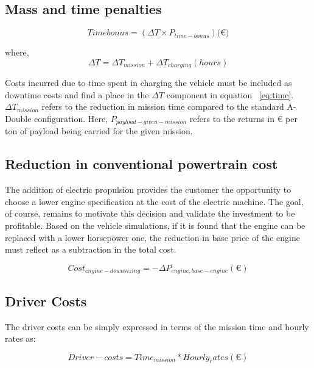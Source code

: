 \documentclass[ExampleMasters.tex]{subfiles}
\begin{document}
		\subsection{Mass and time penalties}

			\begin{equation} \label{eq:time}
				Time bonus = (\Delta T \times P_{time-bonus}) (\euro{)}
			\end{equation}

			where,
			\begin{equation}
				\Delta T = \Delta T_{mission}+\Delta T_{charging} (hours)
			\end{equation}

			Costs incurred due to time spent in charging the vehicle must be included as downtime costs and find a place in the $\Delta T$ component in equation ~\ref{eq:time}. $\Delta T_{mission}$ refers to the reduction in mission time compared to the standard A-Double configuration. Here, $P_{payload-given-mission}$ refers to the returns in \euro{} per ton of payload being carried for the given mission. 

		\subsection{Reduction in conventional powertrain cost}
			The addition of electric propulsion provides the customer the opportunity to choose a lower engine specification at the cost of the electric machine. The goal, of course, remains to motivate this decision and validate the investment to be profitable. Based on the vehicle simulations, if it is found that the engine can be replaced with a lower horsepower one, the reduction in base price of the engine must reflect as a subtraction in the total cost.

			\begin{equation}
				Cost_{engine-downsizing} = -\Delta P_{engine,base-engine} (\euro{})
			\end{equation}

		\subsection{Driver Costs}
			The driver costs can be simply expressed in terms of the mission time and hourly rates as:

			\begin{equation}
			Driver-costs = Time_{mission} * Hourly_rates (\euro{})
			\end{equation}
\end{document}
